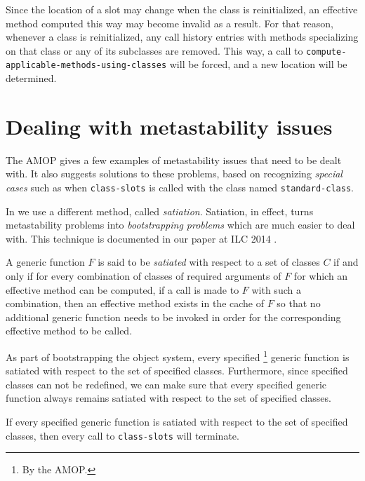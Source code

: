 Since the location of a slot may change when the class is
reinitialized, an effective method computed this way may become
invalid as a result.  For that reason, whenever a class is
reinitialized, any call history entries with methods specializing on
that class or any of its subclasses are removed.  This way, a call to
\texttt{compute-applicable-methods-using-classes} will be forced, and
a new location will be determined.

\section{Dealing with metastability issues}
\label{sec-object-system-dealing-with-metastability-issues}

The AMOP gives a few examples of metastability issues that need to be
dealt with.  It also suggests solutions to these problems, based on
recognizing \emph{special cases} such as when \texttt{class-slots} is
called with the class named \texttt{standard-class}.  

In \sysname{} we use a different method, called \emph{satiation}.
Satiation, in effect, turns metastability problems into
\emph{bootstrapping problems} which are much easier to deal with.
This technique is documented in our paper at ILC 2014
\cite{Strandh:2014:RMI:2635648.2635656}.

\begin{definition}
A generic function $F$ is said to be \emph{satiated} with respect to a
set of classes $C$ if and only if for every combination of classes of
required arguments of $F$ for which an effective method can be
computed, if a call is made to $F$ with such a combination, then an
effective method exists in the cache of $F$ so that no additional
generic function needs to be invoked in order for the corresponding
effective method to be called.
\end{definition}

As part of bootstrapping the object system, every specified%
\footnote{By the AMOP.} generic function is satiated with respect to
the set of specified classes.  Furthermore, since specified classes
can not be redefined, we can make sure that every specified generic
function always remains satiated with respect to the set of specified
classes.

\begin{theorem}
If every specified generic function is satiated with respect to the
set of specified classes, then every call to \texttt{class-slots} will
terminate.
\end{theorem}


